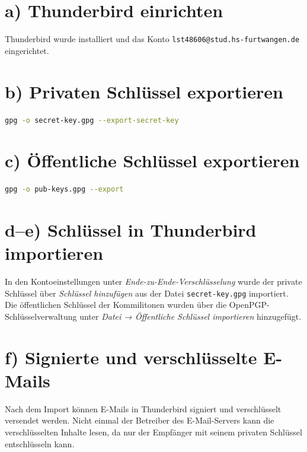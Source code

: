 \documentclass[
	fontsize=12pt,
	paper=a4,
	numbers=noenddot,
	listof=totoc,
	listof=entryprefix,
	listof=nochaptergap,
	bibliography=totoc,
	parskip=half,
	openany
]{scrbook}
\begin{document}
\section*{a) Thunderbird einrichten}

Thunderbird wurde installiert und das Konto \texttt{lst48606@stud.hs-furtwangen.de} eingerichtet.

\section*{b) Privaten Schlüssel exportieren}

\begin{lstlisting}[language=bash]
gpg -o secret-key.gpg --export-secret-key
\end{lstlisting}

\section*{c) Öffentliche Schlüssel exportieren}

\begin{lstlisting}[language=bash]
gpg -o pub-keys.gpg --export
\end{lstlisting}

\section*{d–e) Schlüssel in Thunderbird importieren}

In den Kontoeinstellungen unter \textit{Ende-zu-Ende-Verschlüsselung} wurde der private Schlüssel
über \textit{Schlüssel hinzufügen} aus der Datei \texttt{secret-key.gpg} importiert.
Die öffentlichen Schlüssel der Kommilitonen wurden über die OpenPGP-Schlüsselverwaltung
unter \textit{Datei → Öffentliche Schlüssel importieren} hinzugefügt.

\section*{f) Signierte und verschlüsselte E-Mails}

Nach dem Import können E-Mails in Thunderbird signiert und verschlüsselt versendet werden.
Nicht einmal der Betreiber des E-Mail-Servers kann die verschlüsselten Inhalte lesen,
da nur der Empfänger mit seinem privaten Schlüssel entschlüsseln kann.

\end{document}
